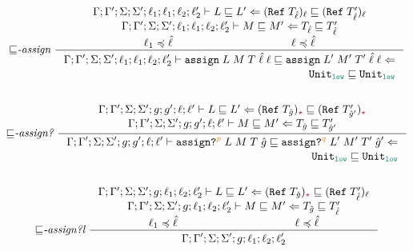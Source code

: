 \begin{figure}[tbp]
\raggedright
  {\small
  \begin{gather*}
  {\sqsubseteq}\textit{-assign}~
  \inference{\precctx{\Gamma}{\Gamma'}{\Sigma}{\Sigma'}{\ell_1}{\ell_1}{\ell_2}{\ell_2'}\ccprec{L}{L'}{(\Refer{T_{\hat{\ell}}})_\ell}{(\Refer{T'_{\hat{\ell}}})_\ell} \\
             \precctx{\Gamma}{\Gamma'}{\Sigma}{\Sigma'}{\ell_1}{\ell_1}{\ell_2}{\ell_2'}\ccprec{M}{M'}{T_{\hat{\ell}}}{T'_{\hat{\ell}}} \\
             \ell_1 \preccurlyeq \hat{\ell} & \ell \preccurlyeq \hat{\ell}}
            {\begin{align*}\precctx{\Gamma}{\Gamma'}{\Sigma}{\Sigma'}{\ell_1}{\ell_1}{\ell_2}{\ell_2'}
                \vdash \ccassign{L}{M}{T}{\hat{\ell}}{\ell} \sqsubseteq \ccassign{L'}{M'}{T'}{\hat{\ell}}{\ell} \Leftarrow \\
                \Unit_{\low} \sqsubseteq \Unit_{\low}
            \end{align*}}
  \\[4ex]
  {\sqsubseteq}\textit{-assign?}~
    \inference{\precctx{\Gamma}{\Gamma'}{\Sigma}{\Sigma'}{g}{g'}{\ell}{\ell'}\ccprec{L}{L'}{(\Refer{T_{\hat{g}}})_{\unk}}{(\Refer{T'_{\hat{g}'}})_{\unk}} \\
      \precctx{\Gamma}{\Gamma'}{\Sigma}{\Sigma'}{g}{g'}{\ell}{\ell'}\ccprec{M}{M'}{T_{\hat{g}}}{T'_{\hat{g}'}} }
              {\begin{align*}\precctx{\Gamma}{\Gamma'}{\Sigma}{\Sigma'}{g}{g'}{\ell}{\ell'}
                  \vdash \ccassignproj{L}{M}{T}{\hat{g}}{p} \sqsubseteq \ccassignproj{L'}{M'}{T'}{\hat{g}'}{q} \Leftarrow \\
                  \Unit_{\low} \sqsubseteq \Unit_{\low}
              \end{align*}}
  \\[4ex]
    {\sqsubseteq}\textit{-assign?l}~
    \inference{\precctx{\Gamma}{\Gamma'}{\Sigma}{\Sigma'}{g}{\ell_1}{\ell_2}{\ell_2'}\ccprec{L}{L'}{(\Refer{T_{\hat{g}}})_{\unk}}{(\Refer{T'_{\hat{\ell}}})_\ell} \\
      \precctx{\Gamma}{\Gamma'}{\Sigma}{\Sigma'}{g}{\ell_1}{\ell_2}{\ell_2'}\ccprec{M}{M'}{T_{\hat{g}}}{T'_{\hat{\ell}}} \\
      \ell_1 \preccurlyeq \hat{\ell} & \ell \preccurlyeq \hat{\ell}}
              {\begin{align*}\precctx{\Gamma}{\Gamma'}{\Sigma}{\Sigma'}{g}{\ell_1}{\ell_2}{\ell_2'}

\end{align*}}
\end{gather*}}
\end{figure}
